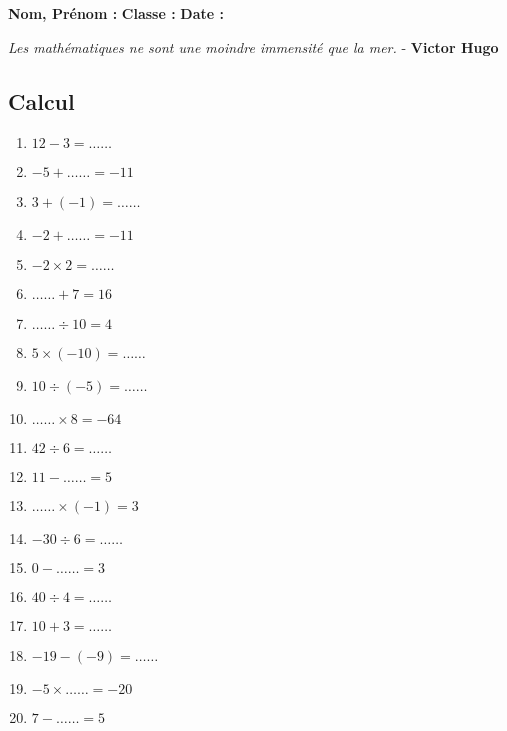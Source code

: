 \documentclass[11pt]{article}
\begin{document}

\newtheorem{Definition}{Définition}
\newtheorem{Theorem}{Théorème}
\newtheorem{Proposition}{Propriété}

\renewcommand{\labelitemi}{$\bullet$}
\renewcommand{\labelitemii}{$\circ$}

\setlength{\columnseprule}{1pt}

\textbf{Nom, Prénom :} \hspace{8cm} \textbf{Classe :} \hspace{3cm} \textbf{Date :}\\
\vspace{-0.8cm}
\begin{center}
  \textit{Les mathématiques ne sont une moindre immensité que la mer.}  - \textbf{Victor Hugo}
\end{center}
\vspace{-0.8cm}

\subsection*{Calcul}
\begin{multicols}{3}\noindent
  \begin{enumerate}
  \item $12 - 3 = \ldots\ldots$
  \item $-5 + \ldots\ldots = -11$
  \item $3 + \left( -1\right) = \ldots\ldots$
  \item $-2 + \ldots\ldots = -11$
  \item $-2 \times 2 = \ldots\ldots$
  \item $\ldots\ldots + 7 = 16$
  \item $\ldots\ldots \div 10 = 4$
  \item $5 \times \left( -10\right) = \ldots\ldots$
  \item $10 \div \left( -5\right) = \ldots\ldots$
  \item $\ldots\ldots \times 8 = -64$
  \item $42 \div 6 = \ldots\ldots$
  \item $11 - \ldots\ldots = 5$
  \item $\ldots\ldots \times \left( -1\right) = 3$
  \item $-30 \div 6 = \ldots\ldots$
  \item $0 - \ldots\ldots = 3$
  \item $40 \div 4 = \ldots\ldots$
  \item $10 + 3 = \ldots\ldots$
  \item $-19 - \left( -9\right) = \ldots\ldots$
  \item $-5 \times \ldots\ldots = -20$
  \item $7 - \ldots\ldots = 5$
  \end{enumerate}
\end{multicols}
\end{document}

